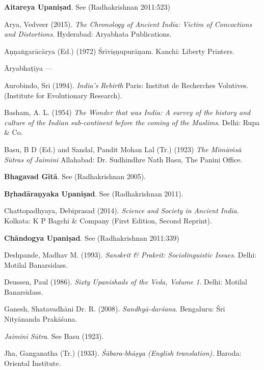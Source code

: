 \begin{thebibliography}{99}
\itemsep=1pt
{{\bf Aitareya Upaniṣad}}. See (Radhakrishnan 2011:523)

Arya, Vedveer (2015). {\sl The Chronology of Ancient India: Victim of Concoctions and Distortions}. Hyderabad: Aryabhata Publications.

Aṇṇaṅgarācārya (Ed.) (1972) Śrīviṣṇupurāṇam. Kanchi: Liberty Printers. 

Āryabhaṭīya ---

Aurobindo, Sri (1994). {\sl India’s Rebirth} Paris: Institut de Recherches Volutives. (Institute for Evolutionary Research).

Basham, A. L. (1954) {\sl The Wonder that was India: A survey of the history and culture of the Indian sub-continent before the coming of the Muslims}. Delhi: Rupa \& Co.

Basu, B D (Ed.) and Sandal, Pandit Mohan Lal (Tr.) (1923) {\sl The Mīmāṁsā Sūtras of Jaiminī} Allahabad: Dr. Sudhindhre Nath Basu, The Panini Office.

{\bf Bhagavad Gītā}. See (Radhakrishnan 2005).

{\bf Bṛhadāraṇyaka Upaniṣad}. See (Radhakrishnan 2011).

Chattopadhyaya, Debiprasad (2014). {\sl Science and Society in Ancient India}. Kolkata: K P Bagchi \& Company (First Edition, Second Reprint).

{\bf Chāndogya Upaniṣad}. See (Radhakrishnan 2011:339)

Deshpande, Madhav M. (1993). {\sl Sanskrit \& Prakrit: Sociolinguistic Issues}. Delhi: Motilal Banarsidass.

Deussen, Paul (1986). {\sl Sixty Upanishads of the Veda, Volume 1}. Delhi: Motilal Banarsidass.

Ganesh, Shatavadhāni Dr. R. (2008). {\sl Sandhyā-darśana}. Bengaluru: Śrī Nityānanda Prakāśana.

{\sl Jaiminī Sūtra}. See Basu (1923).

Jha, Ganganatha (Tr.) (1933). {\sl Śābara-bhāṣya (English translation)}. Baroda: Oriental Institute.


\end{thebibliography}
